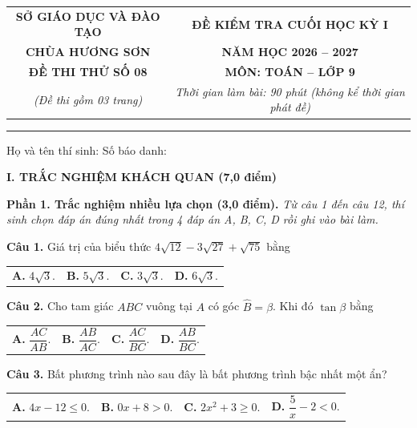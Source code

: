 \documentclass[11pt,a4paper]{article}
\begin{document}
\noindent
\begin{tabular*}{\linewidth}{@{\extracolsep{\fill}}cc@{}}
\textbf{SỞ GIÁO DỤC VÀ ĐÀO TẠO} & \textbf{ĐỀ KIỂM TRA CUỐI HỌC KỲ I} \\
\textbf{CHÙA HƯƠNG SƠN} & \textbf{NĂM HỌC 2026 -- 2027} \\
\textbf{ĐỀ THI THỬ SỐ 08} & \textbf{MÔN: TOÁN -- LỚP 9} \\
\textit{(Đề thi gồm 03 trang)} & \textit{Thời gian làm bài: 90 phút (không kể thời gian phát đề)} \\
\end{tabular*}

\vspace{2mm}
\noindent
\rule{\linewidth}{0.8pt}

\vspace{1mm}
\noindent
Họ và tên thí sinh: \dotfill Số báo danh: \dotfill

\vspace{2mm}
\noindent
\textbf{\large I. TRẮC NGHIỆM KHÁCH QUAN (7,0 điểm)}

\vspace{1mm}
\noindent
\textbf{Phần 1. Trắc nghiệm nhiều lựa chọn (3,0 điểm).} \textit{Từ câu 1 đến câu 12, thí sinh chọn đáp án đúng nhất trong 4 đáp án A, B, C, D rồi ghi vào bài làm.}

\vspace{1.5mm}
\textbf{Câu 1.} Giá trị của biểu thức $4\sqrt{12} - 3\sqrt{27} + \sqrt{75}$ bằng\\
\begin{tabularx}{\linewidth}{XXXX}
\textbf{A.} $4\sqrt{3}$. & \textbf{B.} $5\sqrt{3}$. & \textbf{C.} $3\sqrt{3}$. & \textbf{D.} $6\sqrt{3}$.
\end{tabularx}

\vspace{1.5mm}
\textbf{Câu 2.} Cho tam giác $ABC$ vuông tại $A$ có góc $\widehat{B} = \beta$. Khi đó $\tan \beta$ bằng\\
\begin{tabularx}{\linewidth}{XXXX}
\textbf{A.} $\dfrac{AC}{AB}$. & \textbf{B.} $\dfrac{AB}{AC}$. & \textbf{C.} $\dfrac{AC}{BC}$. & \textbf{D.} $\dfrac{AB}{BC}$.
\end{tabularx}

\vspace{1.5mm}
\textbf{Câu 3.} Bất phương trình nào sau đây là bất phương trình bậc nhất một ẩn?\\
\begin{tabularx}{\linewidth}{XXXX}
\textbf{A.} $4x - 12 \le 0$. & \textbf{B.} $0x + 8 > 0$. & \textbf{C.} $2x^2 + 3 \ge 0$. & \textbf{D.} $\dfrac{5}{x} - 2 < 0$.
\end{tabularx}
\end{document}
